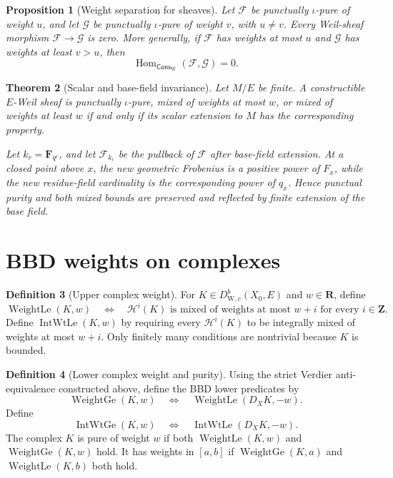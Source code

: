 \documentclass[10pt]{article}
\newtheorem{theorem}{Theorem}[section]
\newtheorem{proposition}[theorem]{Proposition}
\theoremstyle{definition}
\newtheorem{definition}[theorem]{Definition}
\newcommand{\WeilD}{D^b_{\mathrm W,c}}
\newcommand{\WtLe}{\operatorname{WeightLe}}
\newcommand{\WtGe}{\operatorname{WeightGe}}
\begin{document}
\begin{proposition}[Weight separation for sheaves]
Let \(\mathcal F\) be punctually \(\iota\)-pure of weight \(u\), and let
\(\mathcal G\) be punctually \(\iota\)-pure of weight \(v\), with
\(u\ne v\).  Every
Weil-sheaf morphism \(\mathcal F\to\mathcal G\) is zero.  More generally,
if \(\mathcal F\) has weights at most \(u\) and \(\mathcal G\) has weights
at least \(v>u\), then
\[
             \operatorname{Hom}_{\mathsf{Cons}_{\mathrm W}}
             (\mathcal F,\mathcal G)=0.
\]
\end{proposition}

\begin{theorem}[Scalar and base-field invariance]
Let \(M/E\) be finite.  A constructible \(E\)-Weil sheaf is punctually
\(\iota\)-pure,
mixed of weights at most \(w\), or mixed of weights at least \(w\) if and
only if its scalar extension to \(M\) has the corresponding property.

Let \(k_r=\mathbf F_{q^r}\), and let \(\mathcal F_{k_r}\) be the pullback of
\(\mathcal F\) after base-field extension.  At a closed point above \(x\),
the new geometric Frobenius is a positive power of \(F_x\), while the new
residue-field cardinality is the corresponding power of \(q_x\).  Hence
punctual purity and both mixed bounds are preserved and reflected by finite
extension of the base field.
\end{theorem}

\section{BBD weights on complexes}

\begin{definition}[Upper complex weight]
For \(K\in\WeilD(X_0,E)\) and \(w\in\mathbf R\), define
\[
\WtLe(K,w)
 \quad\Longleftrightarrow\quad
 \mathcal H^i(K)\text{ is mixed of weights at most }w+i
 \text{ for every }i\in\mathbf Z.
\]
Define \(\operatorname{IntWtLe}(K,w)\) by requiring every
\(\mathcal H^i(K)\) to be integrally mixed of weights at most \(w+i\).
Only finitely many conditions are nontrivial because \(K\) is bounded.
\end{definition}

\begin{definition}[Lower complex weight and purity]
Using the strict Verdier anti-equivalence constructed above, define the BBD
lower predicates by
\[
             \WtGe(K,w)\quad\Longleftrightarrow\quad
             \WtLe(D_XK,-w).
\]
Define
\[
 \operatorname{IntWtGe}(K,w)\quad\Longleftrightarrow\quad
 \operatorname{IntWtLe}(D_XK,-w).
\]
The complex \(K\) is pure of weight \(w\) if both \(\WtLe(K,w)\) and
\(\WtGe(K,w)\) hold.  It has weights in \([a,b]\) if
\(\WtGe(K,a)\) and \(\WtLe(K,b)\) both hold.
\end{definition}
\end{document}
